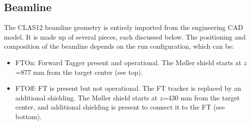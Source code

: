 \subsection{Beamline} \label{sec:beamline}

The CLAS12 beamline geometry is entirely imported from the engineering CAD model.
It is made up of several pieces, each discussed below. The positioning and composition of the beamline
depends on the run configuration, which can be:

\begin{itemize}
	\item FTOn: Forward Tagger present and operational. The M\o ller shield starts at $z$=877 mm from the target center (see  top).
	\item FTOff: FT is present but not operational. The FT tracker is replaced by an additional shielding.
                 The M\o ller shield starts at $z$=430 mm from the target center, and additional shielding
                 is present to connect it to the FT (see  bottom).
\end{itemize}


